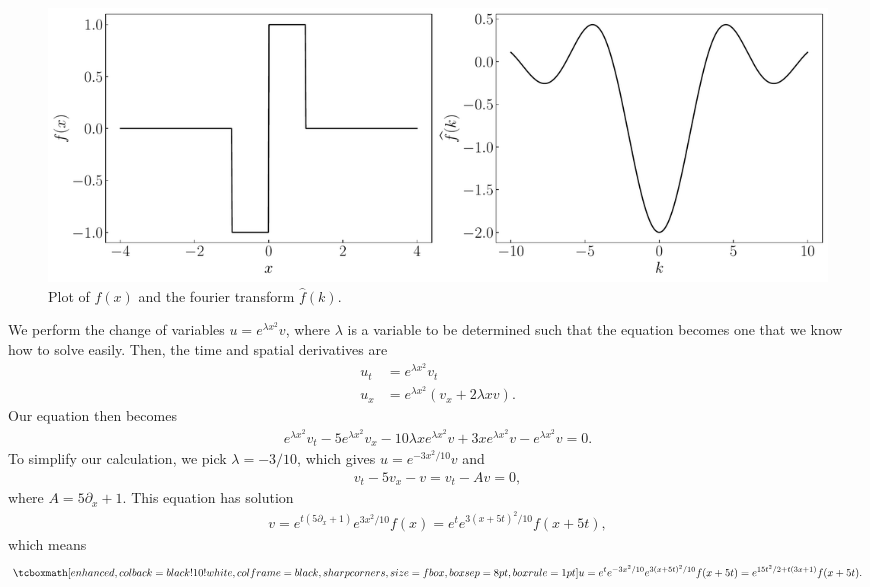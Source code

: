 \begin{figure}[H]
\begin{center}
    \includegraphics[width=\textwidth]{prob6.pdf} 
\end{center} 
\caption{
    Plot of $f(x)$ and the fourier transform $\widehat{f}(k)$.
}
\end{figure}



We perform the change of variables $u = e^{\lambda x^2} v$, where $\lambda$ is a variable to be determined such that the equation becomes one that we know how to solve easily.
Then, the time and spatial derivatives are
\begin{align}
    \label{eq:change-vars}
    u_{t} &= e^{\lambda x^2} v_{t} \\
    u_{x} &= e^{\lambda x^2}( v_{x} + 2 \lambda x v)
.\end{align}
Our equation then becomes
\begin{eqnarray}
    \label{eq:change-vars-eq}
    e^{\lambda x^2} v_{t} - 5e^{\lambda x^2} v_{x} - 10 \lambda x e^{\lambda x^2} v + 3xe^{\lambda x^2}v - e^{\lambda x^2}v = 0
.\end{eqnarray}
To simplify our calculation, we pick $\lambda = -3/10$, which gives $u = e^{-3x^2/10}v$ and
\begin{eqnarray}
    \label{eq:change-vars-eq-2}
    v_{t} - 5v_{x} - v = v_{t} - Av = 0
,\end{eqnarray}
where $A = 5\partial_{x} + 1$.
This equation has solution
\begin{eqnarray}
    \label{eq:v-sol}
    v = e^{t(5 \partial_{x} + 1)}e^{3x^2/10}f(x) = e^{t} e^{3(x + 5t)^2/10} f(x + 5t)
,\end{eqnarray}
which means
\begin{eqnarray}
    \label{eq:u-sol}
    \eqbox{
    u = e^{t}e^{-3x^2/10}e^{3(x+5t)^2/10}f(x+5t) = e^{15t^2/2 + t(3x + 1)}f(x + 5t)
}
.\end{eqnarray}






